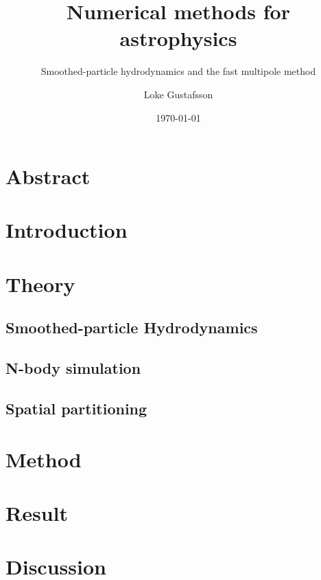 \documentclass{report}
\title{Numerical methods for astrophysics}
\subtitle{Smoothed-particle hydrodynamics and the fast multipole method}
\author{Loke Gustafsson}
\date{\today}
\begin{document}


\chapter*{Abstract}
    

\tableofcontents

\chapter{Introduction}
    

\chapter{Theory}
    \section{Smoothed-particle Hydrodynamics}
    

    \section{N-body simulation}
    

    \section{Spatial partitioning}
    

\chapter{Method}
    

\chapter{Result}
    

\chapter{Discussion}
    

\printbibliography[heading=bibintoc,title={References}]
\end{document}
